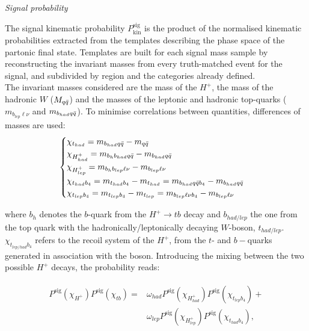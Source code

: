 \textit{Signal probability}

The signal kinematic probability $P^{\text{sig}}_{\text{kin}}$ is the product of the normalised kinematic probabilities extracted from the templates describing the phase space of the partonic final state. Templates are built for each signal mass sample by reconstructing the invariant masses from every truth-matched event for the signal, and subdivided by region and the categories already defined.\\

The invariant masses considered are the mass of the $H^+$, the mass of the hadronic $W$ ($M_{q\Bar{q}}$) and the masses of the leptonic and hadronic top-quarks ($m_{b_{lep}\ell\nu}$ and $m_{b_{had}q\Bar{q}}$). To minimise correlations between quantities, differences of masses are used:
\begin{equation}
    \begin{cases} \chi_{t_{had}}=m_{b_{had}q\Bar{q}}-m_{q\Bar{q}} \\ 
    \chi_{H^+_{had}}=m_{b_hb_{had}q\Bar{q}}-m_{b_{had}q\Bar{q}} \\
    \chi_{H^+_{lep}}=m_{b_hb_{lep}\ell\nu}-m_{b_{lep}\ell\nu}\\
    \chi_{t_{had}b_4}=m_{t_{had}b_4}-m_{t_{had}}=m_{b_{had}q\bar{q}b_4}-m_{b_{had}q\bar{q}}\\
    \chi_{t_{lep}b_4}=m_{t_{lep}b_4}-m_{t_{lep}}=m_{b_{lep}\ell\nu b_4}-m_{b_{lep}\ell\nu}\\
    \end{cases} 
\end{equation}

where $b_h$ denotes the $b$-quark from the $H^+\to tb$ decay and $b_{had/lep}$ the one from the top quark with the hadronically/leptonically decaying $W$-boson, $t_{had/lep}$. $\chi_{t_{lep/had}b_4}$ refers to the recoil system of the $H^+$, from the $t$- and $b-$quarks generated in association with the boson.
Introducing the mixing between the two possible $H^+$ decays, the probability reads:

\begin{align}
    \begin{split}
        P^{\text{sig}}(\chi_{H^+})P^{\text{sig}}(\chi_{tb})=&\omega_{had}P^{\text{sig}}(\chi_{H^+_{had}})P^{\text{sig}}(\chi_{t_{lep}b_4})+\\
        &\omega_{lep}P^{\text{sig}}(\chi_{H^+_{lep}})P^{\text{sig}}(\chi_{t_{had}b_4}),
    \end{split}
\end{align}

